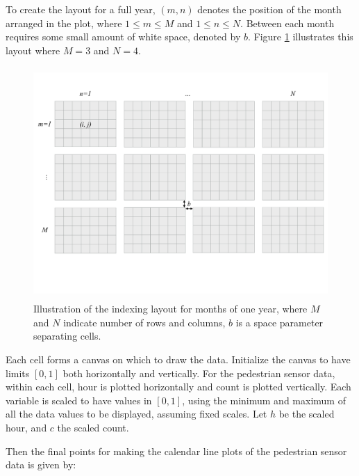 To create the layout for a full year, \((m, n)\) denotes the position of
the month arranged in the plot, where \(1 \le m \le M\) and
\(1 \le n \le N\). Between each month requires some small amount of
white space, denoted by \(b\). Figure \ref{fig:year-diagram} illustrates
this layout where \(M = 3\) and \(N = 4\).

\begin{Schunk}
\begin{figure}

{\centering \includegraphics[width=360pt,height=250pt]{img/year-diagram} 

}

\caption[Illustration of the indexing layout for months of one year, where $M$ and $N$ indicate number of rows and columns, $b$ is a space parameter separating cells]{Illustration of the indexing layout for months of one year, where $M$ and $N$ indicate number of rows and columns, $b$ is a space parameter separating cells.}\label{fig:year-diagram}
\end{figure}
\end{Schunk}

Each cell forms a canvas on which to draw the data. Initialize the
canvas to have limits \([0, 1]\) both horizontally and vertically. For
the pedestrian sensor data, within each cell, hour is plotted
horizontally and count is plotted vertically. Each variable is scaled to
have values in \([0,1]\), using the minimum and maximum of all the data
values to be displayed, assuming fixed scales. Let \(h\) be the scaled
hour, and \(c\) the scaled count.

Then the final points for making the calendar line plots of the
pedestrian sensor data is given by:

